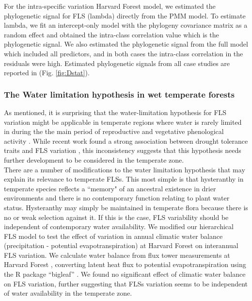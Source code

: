 \documentclass[11pt]{article}
\begin{document}
{\noindent For the intra-specific variation Harvard Forest model, we estimated the phylogenetic signal for FLS (lambda) directly from the PMM model. To estimate lambda, we fit an intercept-only model with the phylogeny covariance matrix as a random effect and obtained the intra-class correlation value which is the phylogenetic signal. We also estimated the phylogenetic signal from the full model which included all predictors, and in both cases the intra-class correlation in the residuals were high. Estimated phylogenetic signals from all case studies are reported in (Fig. \ref{fig:Dstat}).  
  
\subsubsection*{The Water limitation hypothesis in wet temperate forests}
\noindent As mentioned, it is surprising that the water-limitation hypothesis for FLS variation might be applicable in temperate regions where water is rarely limited in during the the main period of reproductive and vegetative phenological activity \citep{Polgar2011}. While recent work found a strong association between drought tolerance traits and FLS variation \citep{Gougherty2018}, this inconsistency suggests that this hypothesis needs further development to be considered in the temperate zone.\\

\noindent There are a number of modifications to the water limitation hypothesis that may explain its relevance to temperate FLSs. This most simple is that hysteranthy in temperate species reflects a ``memory" of an ancestral existence in drier environments and there is no contemporary function relating to plant water status. Hysteranthy may simply be maintained in temperate flora because there is no or weak selection against it. If this is the case, FLS variability should be independent of contemporary water availability. We modified our hierarchical FLS model to test the effect of variation in annual climatic water balance (precipitation - potential evapotranspiration) at Harvard Forest on interannual FLS variation. We calculate water balance from flux tower measurements at Harvard Forest \citep{Hadley2004}, converting latent heat flux to potential evapotranspiration using the R package ``bigleaf'' \citep{Knauer2018}. We found no significant effect of climatic water balance on FLS variation, further suggesting that FLSs variation seems to be independent of water availability in the temperate zone.\\%

}
\end{document}
